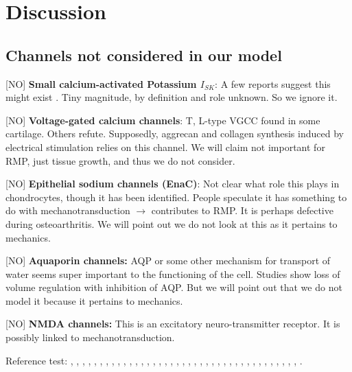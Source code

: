 \section{Discussion}
\label{sec:discussion}



\subsection{Channels not considered in our model}
\label{sec:channels-ignored}

[NO] {\bf Small calcium-activated Potassium $I_{SK}$}: A few reports
suggest this might exist \citep{Halletal1996,
  BarrettJolleyetal2010}. Tiny magnitude, by definition and role
unknown. So we ignore it.

[NO] {\bf Voltage-gated calcium channels}: T, L-type VGCC found in
some cartilage. Others refute. Supposedly, aggrecan and collagen
synthesis induced by electrical stimulation relies on this channel. We
will claim not important for RMP, just tissue growth, and thus we do
not consider.

[NO] {\bf Epithelial sodium channels (EnaC)}: Not clear what role this
plays in chondrocytes, though it has been identified. People speculate
it has something to do with mechanotransduction $\rightarrow$
contributes to RMP. It is perhaps defective during osteoarthritis. We
will point out we do not look at this as it pertains to mechanics.

[NO] {\bf Aquaporin channels:} AQP or some other mechanism for
transport of water seems super important to the functioning of the
cell. Studies show loss of volume regulation with inhibition of
AQP. But we will point out that we do not model it because it pertains
to mechanics.

[NO] {\bf NMDA channels:} This is an excitatory neuro-transmitter
receptor. It is possibly linked to mechanotransduction.


Reference test:
\cite{ArcherWest2003},
\cite{BarrettJolleyetal2010},
\cite{BuckwalterMankin1998},
\cite{CarneyMuir1988},
\cite{Chaetal2009},
\cite{Chuetal2006},
\cite{Clarketal2010},
\cite{Clarketal2011},
\cite{DartStanden1994},
\cite{Edwardsetal1994},
\cite{Fassbender1987},
\cite{Grishkoetal2010},
\cite{Halletal1996},
\cite{Hille2001},
\cite{HorriganAldrich2002},
\cite{LeeUrban1997},
\cite{LesageLazdunski2000},
\cite{Lewisetal2011},
\cite{Maleckaretal2009},
\cite{Mankin1982},
\cite{MillwardSadleretal2000},
\cite{Mobasherietal1997},
\cite{Mobasherietal2007},
\cite{Mobasherietal2005},
\cite{Mobasherietal1998},
\cite{Mowetal1999},
\cite{Nygrenetal1998},
\cite{Otte1991},
\cite{Poole1997},
\cite{RadhakrishnanHindmarsh1993},
\cite{Scholz2002},
\cite{Stein1990},
\cite{Stockwell1991},
\cite{Sugimotoetal1996},
\cite{Tsugaetal2001},
\cite{UNKNOWN},
\cite{Urban1994},
\cite{Walshetal1992},
\cite{Wilkinsetal2000},
\cite{Wuetal2007}.


